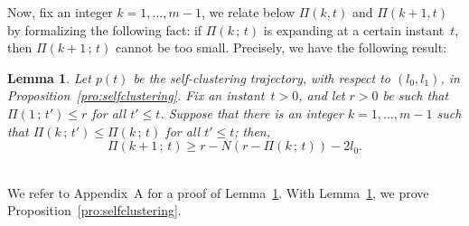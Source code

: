 \documentclass[10pt,twocolumn,twoside]{IEEEtran}
\newtheorem{lem}{Lemma}
\renewcommand{\(}{\left (}
\renewcommand{\)}{\right )}
\renewcommand{\;}{\,;\,}
\begin{document}
Now, fix an integer $k = 1,\ldots, m-1$,  we relate below $\Pi(k,t)$ and $\Pi(k+1,t)$ by formalizing the following fact: 
if $\Pi(k\; t)$ is expanding at a certain instant~$t$, then $\Pi(k+1\; t)$ cannot be too small. Precisely, we have the following result:  




\begin{lem}\label{lem:boundedforPI}
Let $p(t)$ be the self-clustering trajectory, with respect to $(l_0,l_1)$, in Proposition~\ref{pro:selfclustering}.  Fix an instant~$t > 0$, and let $r>0$ be such that   $\Pi(1\; t') \le r$ for all $t' \le t$.   
Suppose that there is an integer $k= 1,\ldots, m-1$ such that $\Pi(k\; t') \le \Pi(k\; t)$  for all $t' \le t$;  
then,  
$$
\Pi(k+1\; t) \ge r - N (r - \Pi(k\; t) ) -  2 l_0. 
$$ \,
\end{lem}

We refer to Appendix~A for a proof of Lemma~\ref{lem:boundedforPI}. 
 With Lemma~\ref{lem:boundedforPI}, we prove Proposition~\ref{pro:selfclustering}. 
\end{document}
